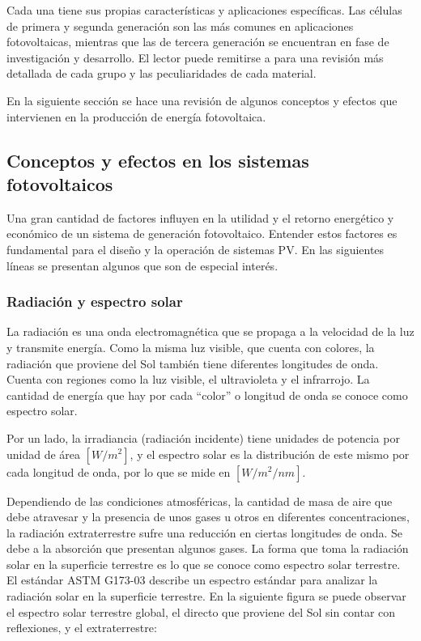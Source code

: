 Cada una tiene sus propias características y aplicaciones específicas. Las células de primera y segunda generación son las más comunes en aplicaciones fotovoltaicas, mientras que las de tercera generación se encuentran en fase de investigación y desarrollo. El lector puede remitirse a \cite{Shubbak_2019} para una revisión más detallada de cada grupo y las peculiaridades de cada material.

En la siguiente sección se hace una revisión de algunos conceptos y efectos que intervienen en la producción de energía fotovoltaica.

\subsection{Conceptos y efectos en los sistemas fotovoltaicos}

Una gran cantidad de factores influyen en la utilidad y el retorno energético y económico de un sistema de generación fotovoltaico. Entender estos factores es fundamental para el diseño y la operación de sistemas PV. En las siguientes líneas se presentan algunos que son de especial interés.

\subsubsection{Radiación y espectro solar}

La radiación es una onda electromagnética que se propaga a la velocidad de la luz y transmite energía. Como la misma luz visible, que cuenta con colores, la radiación que proviene del Sol también tiene diferentes longitudes de onda. Cuenta con regiones como la luz visible, el \gls{ultravioleta} y el \gls{infrarrojo}. La cantidad de energía que hay por cada ``color'' o \gls{longitud de onda} se conoce como espectro solar.

Por un lado, la \gls{irradiancia} (radiación incidente) tiene unidades de potencia por unidad de área $[W/m^2]$, y el espectro solar es la distribución de este mismo por cada \gls{longitud de onda}, por lo que se mide en $[W/m^2/nm]$.

Dependiendo de las condiciones atmosféricas, la cantidad de masa de aire que debe atravesar y la presencia de unos gases u otros en diferentes concentraciones, la \gls{radiación extraterrestre} sufre una reducción en ciertas longitudes de onda. Se debe a la absorción que presentan algunos gases. La forma que toma la \gls{radiación solar} en la superficie terrestre es lo que se conoce como espectro solar terrestre. El \gls{estándar} ASTM G173-03 \cite{astm_g173-03} describe un \gls{espectro estándar} para analizar la radiación solar en la superficie terrestre. En la siguiente figura se puede observar el espectro solar terrestre global, el directo que proviene del Sol sin contar con reflexiones, y el extraterrestre:

